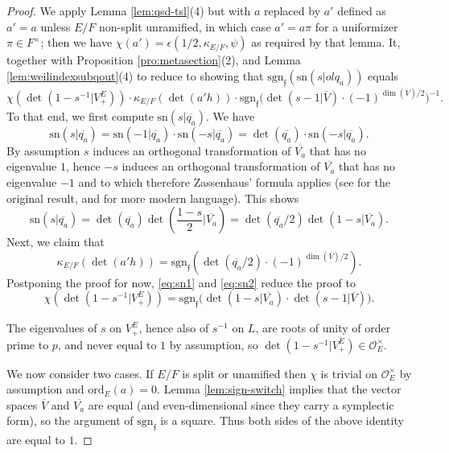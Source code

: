 \documentclass{article}
\def\tx#1{\textrm{#1}}
\def\ol#1{\overline{#1}}
\def\cO{\mathcal{O}}
\theoremstyle{definition}
\numberwithin{equation}{subsection}
\renewcommand{\-}{\hyp{}}
\newcommand{\rf}{\mathfrak{f}}
\newcommand{\oVS}{\overline{V}}
\newcommand{\oVO}{\overline{V_a}}
\begin{document}
\begin{proof}
	We apply Lemma \ref{lem:qsd-tsl}(4) but with $a$ replaced by $a'$ defined as $a'=a$ unless $E/F$ non-split unramified, in which case $a'=a\pi$ for a uniformizer $\pi \in F^\times$; then we have $\chi(a')=\epsilon(1/2,\kappa_{E/F},\psi)$ as required by that lemma. It, together with Proposition \ref{pro:metasection}(2), and Lemma \ref{lem:weilindexsubqout}(4) to reduce to showing that $\tx{sgn}_\rf(\tx{sn}(s|ol{q_a}))$ equals
	\[ \chi(\det(1-s^{-1}|V_+^E))\cdot \kappa_{E/F}(\det(a'h)) \cdot \tx{sgn}_\rf\big(\det(s-1|\oVS)\cdot(-1)^{\dim(\oVS)/2}\big)^{-1}.\]
	To that end, we first compute $\tx{sn}(s|\ol{q_a})$. We have
	\[ \tx{sn}(s|\ol{q_a})=\tx{sn}(-1|\ol{q_a})\cdot \tx{sn}(-s|\ol{q_a}) = \det(\ol{q_a}) \cdot \tx{sn}(-s|\ol{q_a}). \]
	By assumption $s$ induces an orthogonal transformation of $\oVO$ that has no eigenvalue $1$, hence $-s$ induces an orthogonal transformation of $\oVO$ that has no eigenvalue $-1$ and to which therefore Zassenhaus' formula applies (see \cite[\S2]{Zass1962} for the original result, and \cite[Theorem 3.5]{CT2020} for more modern language). This shows
	\begin{equation} \label{eq:sn1}
		\tx{sn}(s|\ol{q_a}) = \det(\ol{q_a})\det\left(\frac{1-s}{2}\Big| \oVO \right) = \det(\ol{q_a}/2)\det(1-s|\oVO).	
	\end{equation}
	Next, we claim that 
	\begin{equation} \label{eq:sn2}
		\kappa_{E/F}(\det(a'h)) = \tx{sgn}_\rf(\det(\ol{q_a}/2) \cdot (-1)^{\dim(\oVS)/2}).	
	\end{equation}
	Postponing the proof for now, \eqref{eq:sn1} and \eqref{eq:sn2} reduce the proof to
	\[ \chi(\det(1-s^{-1}|V_+^E)) = \tx{sgn}_\rf\Big(\det(1-s|\oVO)\cdot\det(s-1|\oVS)\Big). \]

	The eigenvalues of $s$ on $V_+^E$, hence also of $s^{-1}$ on $L$, are roots of unity of order prime to $p$, and never equal to $1$ by assumption, so $\det(1-s^{-1}|V_+^E) \in \cO_E^\times$. 
	
	We now consider two cases. If $E/F$ is split or unamified then $\chi$ is trivial on $\cO_E^\times$ by assumption and $\tx{ord}_E(a)=0$. Lemma \ref{lem:sign-switch} implies that the vector spaces $\oVS$ and $\oVO$ are equal (and even-dimensional since they carry a symplectic form), so the argument of $\tx{sgn}_\rf$ is a square. Thus both sides of the above identity are equal to $1$.


\end{proof}
\end{document}
